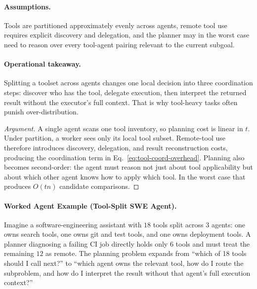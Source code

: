 \paragraph{Assumptions.}
Tools are partitioned approximately evenly across agents, remote tool use requires explicit discovery and
delegation, and the planner may in the worst case need to reason over every tool-agent pairing relevant
to the current subgoal.

\paragraph{Operational takeaway.}
Splitting a toolset across agents changes one local decision into three coordination steps: discover who
has the tool, delegate execution, then interpret the returned result without the executor's full context.
That is why tool-heavy tasks often punish over-distribution.

\begin{proof}[Argument]
A single agent scans one tool inventory, so planning cost is linear in $t$. Under partition, a worker
sees only its local tool subset. Remote-tool use therefore introduces discovery, delegation, and result
reconstruction costs, producing the coordination term in Eq.~\eqref{eq:tool-coord-overhead}. Planning
also becomes second-order: the agent must reason not just about tool applicability but about which other
agent knows how to apply which tool. In the worst case that produces $O(tn)$ candidate comparisons.
\end{proof}

\paragraph{Worked Agent Example (Tool-Split SWE Agent).}
Imagine a software-engineering assistant with $18$ tools split across $3$ agents: one owns search tools,
one owns git and test tools, and one owns deployment tools. A planner diagnosing a failing CI job
directly holds only $6$ tools and must treat the remaining $12$ as remote. The planning problem expands
from ``which of 18 tools should I call next?'' to ``which agent owns the relevant tool, how do I route
the subproblem, and how do I interpret the result without that agent's full execution context?''

